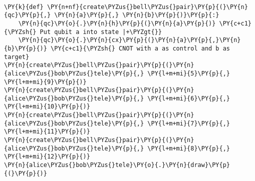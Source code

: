             
    
    \begin{center}
    \end{center}
    { \hspace*{\fill} \\}
    

    \begin{tcolorbox}[breakable, size=fbox, boxrule=1pt, pad at break*=1mm,colback=cellbackground, colframe=cellborder]
\begin{Verbatim}[commandchars=\\\{\}]
\PY{k}{def} \PY{n+nf}{create\PYZus{}bell\PYZus{}pair}\PY{p}{(}\PY{n}{qc}\PY{p}{,} \PY{n}{a}\PY{p}{,} \PY{n}{b}\PY{p}{)}\PY{p}{:}
    \PY{n}{qc}\PY{o}{.}\PY{n}{h}\PY{p}{(}\PY{n}{a}\PY{p}{)} \PY{c+c1}{\PYZsh{} Put qubit a into state |+\PYZgt{}}
    \PY{n}{qc}\PY{o}{.}\PY{n}{cx}\PY{p}{(}\PY{n}{a}\PY{p}{,}\PY{n}{b}\PY{p}{)} \PY{c+c1}{\PYZsh{} CNOT with a as control and b as target}
\PY{n}{create\PYZus{}bell\PYZus{}pair}\PY{p}{(}\PY{n}{alice\PYZus{}bob\PYZus{}tele}\PY{p}{,} \PY{l+m+mi}{5}\PY{p}{,} \PY{l+m+mi}{9}\PY{p}{)}
\PY{n}{create\PYZus{}bell\PYZus{}pair}\PY{p}{(}\PY{n}{alice\PYZus{}bob\PYZus{}tele}\PY{p}{,} \PY{l+m+mi}{6}\PY{p}{,} \PY{l+m+mi}{10}\PY{p}{)}
\PY{n}{create\PYZus{}bell\PYZus{}pair}\PY{p}{(}\PY{n}{alice\PYZus{}bob\PYZus{}tele}\PY{p}{,} \PY{l+m+mi}{7}\PY{p}{,} \PY{l+m+mi}{11}\PY{p}{)}
\PY{n}{create\PYZus{}bell\PYZus{}pair}\PY{p}{(}\PY{n}{alice\PYZus{}bob\PYZus{}tele}\PY{p}{,} \PY{l+m+mi}{8}\PY{p}{,} \PY{l+m+mi}{12}\PY{p}{)}
\PY{n}{alice\PYZus{}bob\PYZus{}tele}\PY{o}{.}\PY{n}{draw}\PY{p}{(}\PY{p}{)}
\end{Verbatim}
\end{tcolorbox}
 
            
    
    \begin{center}
    \end{center}
    { \hspace*{\fill} \\}
    

